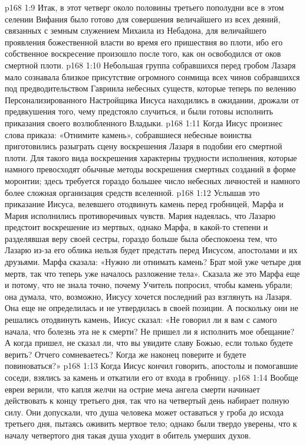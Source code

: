 \vs p168 1:9 Итак, в этот четверг около половины третьего пополудни все в этом селении Вифания было готово для совершения величайшего из всех деяний, связанных с земным служением Михаила из Небадона, для величайшего проявления божественной власти во время его пришествия во плоти, ибо его собственное воскресение произошло после того, как он освободился от оков смертной плоти.
\vs p168 1:10 Небольшая группа собравшихся перед гробом Лазаря мало сознавала близкое присутствие огромного сонмища всех чинов собравшихся под предводительством Гавриила небесных существ, которые теперь по велению Персонализированного Настройщика Иисуса находились в ожидании, дрожали от предвкушения того, чему предстояло случиться, и были готовы исполнить приказания своего возлюбленного Владыки.
\vs p168 1:11 Когда Иисус произнес слова приказа: «Отнимите камень», собравшиеся небесные воинства приготовились разыграть сцену воскрешения Лазаря в подобии его смертной плоти. Для такого вида воскрешения характерны трудности исполнения, которые намного превосходят обычные методы воскрешения смертных созданий в форме моронтии; здесь требуется гораздо большее число небесных личностей и намного более сложная организация средств вселенной.
\vs p168 1:12 Услышав это приказание Иисуса, велевшего отодвинуть камень перед гробницей, Марфа и Мария исполнились противоречивых чувств. Мария надеялась, что Лазарю предстоит воскрешение из мертвых, однако Марфа, в какой\hyp{}то степени и разделявшая веру своей сестры, гораздо больше была обеспокоена тем, что Лазарю из\hyp{}за его облика нельзя будет предстать перед Иисусом, апостолами и их друзьями. Марфа сказала: «Нужно ли отнимать камень? Брат мой уже четыре дня мертв, так что теперь уже началось разложение тела». Сказала же это Марфа еще и потому, что не знала точно, почему Учитель попросил, чтобы камень убрали; она думала, что, возможно, Иисусу хочется последний раз взглянуть на Лазаря. Она еще не определилась и не утвердилась в своей позиции. А поскольку они не решались отодвинуть камень, Иисус сказал: «Не говорил ли я вам с самого начала, что болезнь эта не к смерти? Не пришел ли я исполнить мое обещание? А когда пришел, не сказал ли, что вы увидите славу Божью, если только будете верить? Отчего сомневаетесь? Когда же наконец поверите и будете повиноваться?»
\vs p168 1:13 Когда Иисус кончил говорить, апостолы и помогавшие соседи, взялись за камень и откатили его от входа в гробницу.
\vs p168 1:14 \pc Вообще евреи верили, что капля желчи на острие меча ангела смерти начинает действовать к концу третьего дня, так что на четвертый день набирает полную силу. Они допускали, что душа человека может оставаться у гроба до исхода третьего дня, пытаясь оживить мертвое тело; однако были твердо уверены, что к началу четвертого дня такая душа уходит в обитель умерших духов.
